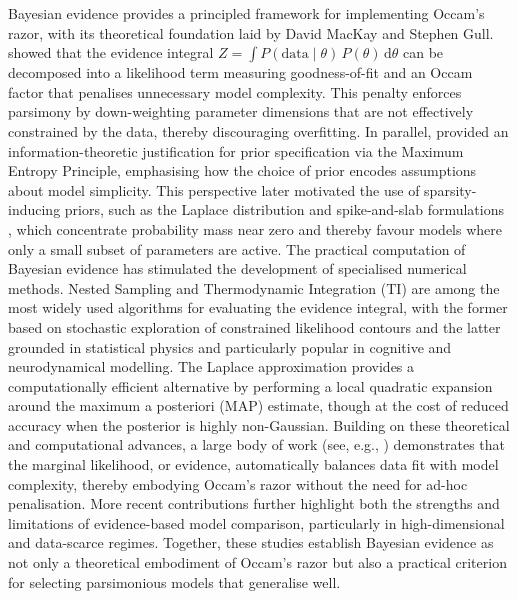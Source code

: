 Bayesian evidence provides a principled framework for implementing Occam's razor, with its theoretical foundation laid by David MacKay and Stephen Gull.
\cite{mackay1992} showed that the evidence integral $Z = \int P(\text{data} \mid \theta)\, P(\theta)\, \mathrm{d}\theta$
can be decomposed into a likelihood term measuring goodness-of-fit and an Occam factor that penalises unnecessary model complexity. This penalty enforces parsimony by down-weighting parameter dimensions that are not effectively constrained by the data, thereby discouraging overfitting. 
In parallel, \cite{gull1988} provided an information-theoretic justification for prior specification via the Maximum Entropy Principle, emphasising how the choice of prior encodes assumptions about model simplicity. This perspective later motivated the use of sparsity-inducing priors, such as the Laplace distribution \citep{park2008} and spike-and-slab formulations \citep{mitchell1988, george1993}, which concentrate probability mass near zero and thereby favour models where only a small subset of parameters are active.
The practical computation of Bayesian evidence has stimulated the development of specialised numerical methods. Nested Sampling \citep{buchner2016,buchner2023} and Thermodynamic Integration (TI) \citep{aponte2022} are among the most widely used algorithms for evaluating the evidence integral, with the former based on stochastic exploration of constrained likelihood contours and the latter grounded in statistical physics and particularly popular in cognitive and neurodynamical modelling. The Laplace approximation \citep{mackay2003} provides a computationally efficient alternative by performing a local quadratic expansion around the maximum a posteriori (MAP) estimate, though at the cost of reduced accuracy when the posterior is highly non-Gaussian. 
Building on these theoretical and computational advances, a large body of work (see, e.g., \cite{rougier2021, bayarri2012}) demonstrates that the marginal likelihood, or evidence, automatically balances data fit with model complexity, thereby embodying Occam’s razor without the need for ad-hoc penalisation. More recent contributions \citep{lotfi2022, knuth2015} further highlight both the strengths and limitations of evidence-based model comparison, particularly in high-dimensional and data-scarce regimes. Together, these studies establish Bayesian evidence as not only a theoretical embodiment of Occam’s razor but also a practical criterion for selecting parsimonious models that generalise well.


